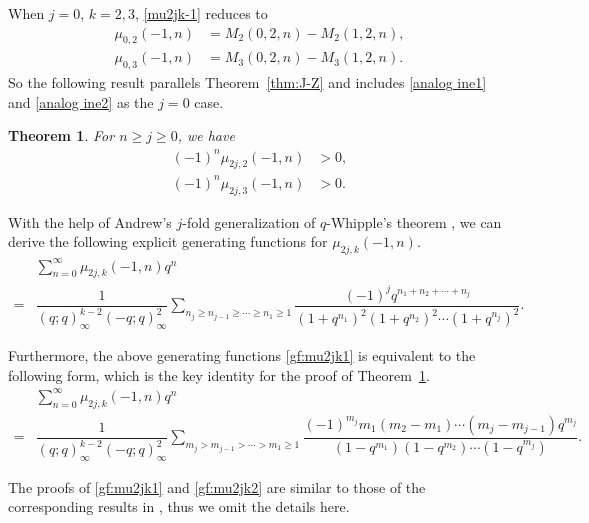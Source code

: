 \documentclass[12pt]{amsart}
\numberwithin{equation}{section}
\theoremstyle{plain}
\newtheorem{theorem}{Theorem}[section]
\theoremstyle{definition}
\begin{document}
When $j=0$, $k=2, 3$, \eqref{mu2jk-1} reduces to
\begin{align*}
\mu_{0,2}(-1,n) &=M_{2}(0,2,n)-M_{2}(1,2,n),\\
\mu_{0,3}(-1,n) &=M_{3}(0,2,n)-M_{3}(1,2,n).
\end{align*}
So the following result parallels Theorem~\ref{thm:J-Z} and includes \eqref{analog ine1} and \eqref{analog ine2} as the $j=0$ case.
\begin{theorem}\label{thm:positivity}
For $n\geq j\geq0$, we have
\begin{align}
(-1)^{n}\mu_{2j,2}(-1,n) &>0, \label{2-color po}\\
(-1)^{n}\mu_{2j,3}(-1,n) &>0. \label{3-color po}
\end{align}
\end{theorem}

With the help of Andrew's $j$-fold generalization of $q$-Whipple's theorem \cite[p.199, Theorem~4]{Andr1}, we can derive the following explicit generating functions for $\mu_{2j,k}(-1,n)$.
\begin{align}\label{gf:mu2jk1}
&\sum_{n=0}^{\infty}\mu_{2j,k}(-1,n)q^{n} \\
=&\dfrac{1}{(q;q)_{\infty}^{k-2}(-q;q)_{\infty}^{2}}\sum_{n_{j}\geq n_{j-1}\geq\cdots\geq n_{1}\geq1}\dfrac{(-1)^{j}q^{n_{1}+n_{2}+\cdots+n_{j}}}{(1+q^{n_{1}})^{2}(1+q^{n_{2}})^{2}\cdots(1+q^{n_{j}})^{2}}.\nonumber
\end{align}

Furthermore, the above generating functions \eqref{gf:mu2jk1} is equivalent to the following form, which is the key identity for the proof of Theorem~\ref{thm:positivity}.
\begin{align}\label{gf:mu2jk2}
&\sum_{n=0}^{\infty}\mu_{2j,k}(-1,n)q^{n} \\
=&\dfrac{1}{(q;q)_{\infty}^{k-2}(-q;q)_{\infty}^{2}}\sum_{m_{j}> m_{j-1}>\cdots>m_{1}\geq1}\dfrac{(-1)^{m_{j}}m_{1}(m_{2}-m_{1})\cdots(m_{j}-m_{j-1})q^{m_{j}}}{(1-q^{m_{1}})(1-q^{m_{2}})\cdots(1-q^{m_{j}})}.\nonumber
\end{align}

The proofs of \eqref{gf:mu2jk1} and \eqref{gf:mu2jk2} are similar to those of the corresponding results in \cite{JZ}, thus we omit the details here.
\end{document}
